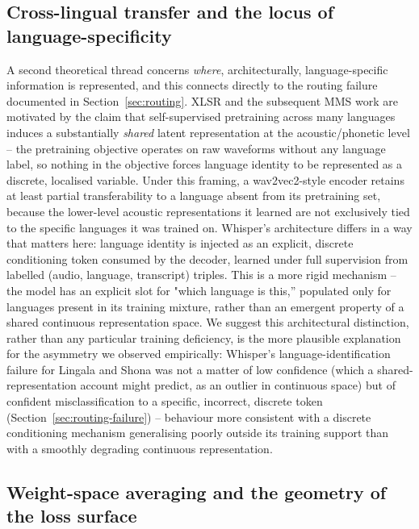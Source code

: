 \documentclass[11pt]{article}
\begin{document}
\subsection{Cross-lingual transfer and the locus of language-specificity}

A second theoretical thread concerns \emph{where}, architecturally, language-specific information is represented, and this connects directly to the routing failure documented in Section~\ref{sec:routing}. XLSR \cite{conneau2021xlsr} and the subsequent MMS work \cite{pratap2024mms} are motivated by the claim that self-supervised pretraining across many languages induces a substantially \emph{shared} latent representation at the acoustic/phonetic level -- the pretraining objective operates on raw waveforms without any language label, so nothing in the objective forces language identity to be represented as a discrete, localised variable. Under this framing, a wav2vec2-style encoder retains at least partial transferability to a language absent from its pretraining set, because the lower-level acoustic representations it learned are not exclusively tied to the specific languages it was trained on. Whisper's architecture differs in a way that matters here: language identity is injected as an explicit, discrete conditioning token consumed by the decoder, learned under full supervision from labelled (audio, language, transcript) triples. This is a more rigid mechanism -- the model has an explicit slot for "which language is this,'' populated only for languages present in its training mixture, rather than an emergent property of a shared continuous representation space. We suggest this architectural distinction, rather than any particular training deficiency, is the more plausible explanation for the asymmetry we observed empirically: Whisper's language-identification failure for Lingala and Shona was not a matter of low confidence (which a shared-representation account might predict, as an outlier in continuous space) but of confident misclassification to a specific, incorrect, discrete token (Section~\ref{sec:routing-failure}) -- behaviour more consistent with a discrete conditioning mechanism generalising poorly outside its training support than with a smoothly degrading continuous representation.

\subsection{Weight-space averaging and the geometry of the loss surface}
\end{document}
